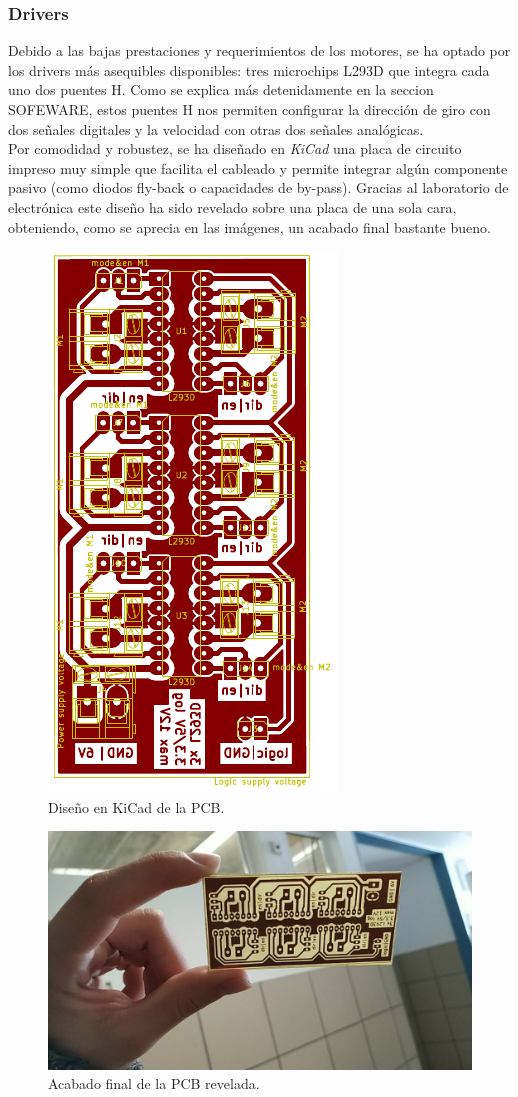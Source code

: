 \subsubsection{Drivers}
Debido a las bajas prestaciones y requerimientos de los motores, se ha optado por los drivers más asequibles disponibles: tres microchips L293D que integra cada uno dos puentes H. Como se explica más detenidamente en la seccion SOFEWARE, estos puentes H nos permiten configurar la dirección de giro con dos señales digitales y la velocidad con otras dos señales analógicas.\\
Por comodidad y robustez, se ha diseñado en \textit{KiCad} una placa de circuito impreso muy simple que facilita el cableado y permite integrar algún componente pasivo (como diodos fly-back o capacidades de by-pass). Gracias al laboratorio de electrónica este diseño ha sido revelado sobre una placa de una sola cara, obteniendo, como se aprecia en las imágenes, un acabado final bastante bueno.
 \begin{figure}[h!]
 	\centering
 	\includegraphics[width=.6\textwidth]{images/hw/pcb_kicad}
 	\caption{Diseño en KiCad de la PCB.}
 \end{figure}
  \begin{figure}[h!]
  	\centering
  	\includegraphics[width=.6\textwidth]{images/hw/pcb_img}
  	\caption{Acabado final de la PCB revelada.}
  \end{figure}
	
